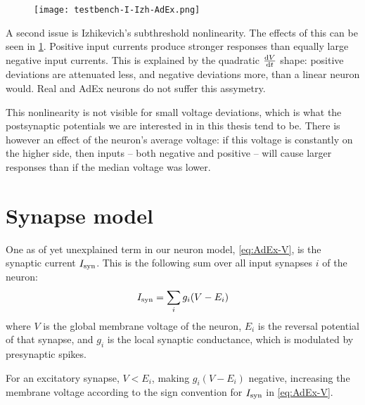\begin{figure}
    \hspace*{-2em}
    \texttt{[image: testbench-I-Izh-AdEx.png]}
    \label{fig:testbench-I-Izh-AdEx}
\end{figure}

A second issue is Izhikevich's subthreshold nonlinearity. The effects of this can be seen in \cref{fig:testbench-I-Izh-AdEx}. Positive input currents produce stronger responses than equally large negative input currents. This is explained by the quadratic $\frac{\mathrm{d}V}{\mathrm{d}t}$ shape: positive deviations are attenuated less, and negative deviations more, than a linear neuron would. Real and AdEx neurons do not suffer this assymetry.

This nonlinearity is not visible for small voltage deviations, which is what the postsynaptic potentials we are interested in in this thesis tend to be. There is however an effect of the neuron's average voltage: if this voltage is constantly on the higher side, then inputs -- both negative and positive -- will cause larger responses than if the median voltage was lower.


\clearpage
\section{Synapse model}
\label{sec:synapse_model}

One as of yet unexplained term in our neuron model, \cref{eq:AdEx-V}, is the synaptic current $I_{\text{syn}}$.
This is the following sum over all input synapses $i$ of the neuron:
\begin{equation}
    I_{\text{syn}} = \sum_i g_i (V - E_i)
    \label{eq:I_syn}
\end{equation}
where $V$ is the global membrane voltage of the neuron, $E_i$ is the reversal potential of that synapse, and $g_i$ is the local synaptic conductance, which is modulated by presynaptic spikes.

For an excitatory synapse, $V < E_i$, making $g_i (V - E_i)$ negative, increasing the membrane voltage according to the sign convention for $I_{\text{syn}}$ in \cref{eq:AdEx-V}.

